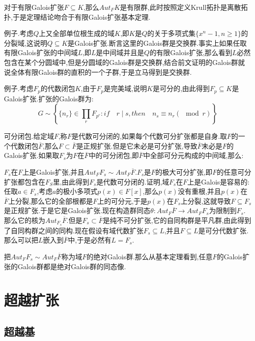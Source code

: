 对于有限Galois扩张$F\subseteq K$,那么$Aut_FK$是有限群,此时按照定义Krull拓扑是离散拓扑,于是定理结论吻合于有限Galois扩张基本定理.

例子.考虑$Q$上又全部单位根生成的域$K$,即$K$是$Q$的关于多项式集$\{x^n-1,n\ge1\}$的分裂域,这说明$Q\subseteq K$是Galois扩张.断言这里的Galois群是交换群.事实上如果任取有限Galois扩张的中间域$L$,即$L$是中间域并且是$Q$的有限Galois扩张,那么看到$L$必然包含在某个分圆域中,但是分圆域的Galois群是交换群,结合前文证明的Galois群就说全体有限Galois群的直积的一个子群,于是立马得到是交换群.

例子.考虑$F_p$的代数闭包$K$,由于$F_p$是完美域,说明$K$是可分的,由此得到$F_p\subseteq K$是Galois扩张.扩张的Galois群为:
$$G\sim\left\{\{n_r\}\in\prod_rF_{p^r}: if\quad r\mid s,then\quad n_s\equiv n_r(\mod r) \right\}$$

可分闭包.给定域$F$,称$F$是代数可分闭的,如果每个代数可分扩张都是自身.取$F$的一个代数闭包$\overline{F}$,那么$F\subset\overline{F}$是正规扩张.但是它未必是可分扩张,导致$\overline{F}$未必是$F$的Galois扩张.如果取$F_s$为$F$在$\overline{F}$中的可分闭包,即$\overline{F}$中全部可分元构成的中间域,那么:

$F_s$在$F$上是Galois扩张,并且$Aut_FF_s\sim Aut_F\overline{F}$.$F_s$是$F$的极大可分扩张,即$F$的任意可分扩张都包含在$F_S$里,由此得到$F_s$是代数可分闭的.证明,域$F_s$在$F$上是Galois是容易的:任取$a\in F_s$,考虑$a$的极小多项式$p(x)\in F[x]$,那么$p(x)$没有重根,并且$p(x)$在$\overline{F}$上分裂,那么它的全部根都是$F$上的可分元,于是$p(x)$在$F_s$上分裂,这就导致$F\subseteq F_s$是正规扩张.于是它是Galois扩张.现在构造群同态$\theta:Aut_F\overline{F}\to Aut_FF_s$为限制到$F_s$.那么它的核为$Aut_{F_s}\overline{F}$.但是$F_s\subset\overline{F}$是纯不可分扩张,它的自同构群是平凡群,由此得到了自同构群之间的同构.现在假设有域代数扩张$F_s\subseteq L$,并且$F\subseteq L$是可分代数扩张.那么可以把$L$嵌入到$\overline{F}$中,于是必然有$L=F_s$.

把$Aut_FF_s\sim Aut_F\overline{F}$称为域$F$的绝对Galois群.那么从基本定理看到,任意$F$的Galois扩张的Galois群都是绝对Galois群的同态像.
\newpage
\section{超越扩张}
\subsection{超越基}

